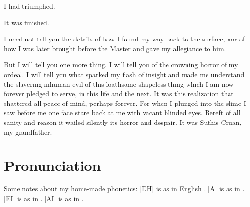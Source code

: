 \documentclass
  [a4paper,
   12pt,
   oneside
  ]%
  {article}
\begin{document}
I had triumphed. 

It was finished. 

I need not tell you the details of how I found my way back to the surface, nor of how I was later brought before the Master and gave my allegiance to him.

But I will tell you one more thing. 
I will tell you of the crowning horror of my ordeal. 
I will tell you what sparked my flash of insight and made me understand the slavering inhuman evil of this loathsome shapeless thing which I am now forever pledged to serve, in this life and the next. 
It was this realization that shattered all peace of mind, perhaps forever. 
For when I plunged into the slime I saw before me one face stare back at me with vacant blinded eyes. 
Bereft of all sanity and reason it wailed silently its horror and despair.
It was Suthis Cruan, my grandfather. 









\newpage
\appendix
\section{Pronunciation}
Some notes about my home-made phonetics: 
[DH] is as in English . 
[Ä] is as in .
[EI] is as in .
[AI] is as in .    

\begin{pronunciationenvironment}{
}
\end{pronunciationenvironment}
\end{document}

